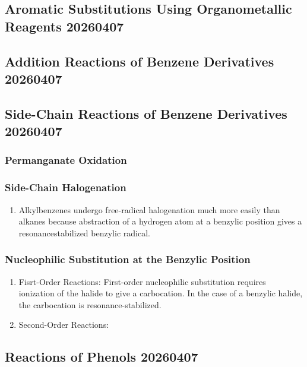 \subsection{Aromatic Substitutions Using Organometallic Reagents 20260407}

\subsection{Addition Reactions of Benzene Derivatives 20260407}

\subsection{Side-Chain Reactions of Benzene Derivatives 20260407}

\subsubsection{Permanganate Oxidation}

\subsubsection{Side-Chain Halogenation}

\begin{enumerate}
    \item Alkylbenzenes undergo free-radical halogenation much more easily than alkanes because abstraction of a hydrogen atom at a benzylic position gives a resonancestabilized benzylic radical.
\end{enumerate}

\subsubsection{Nucleophilic Substitution at the Benzylic Position}

\begin{enumerate}
    \item Fisrt-Order Reactions: First-order nucleophilic substitution requires ionization of the halide to give a carbocation. In the case of a benzylic halide, the carbocation is resonance-stabilized.
    \item Second-Order Reactions: 
\end{enumerate}

\subsection{Reactions of Phenols 20260407}


